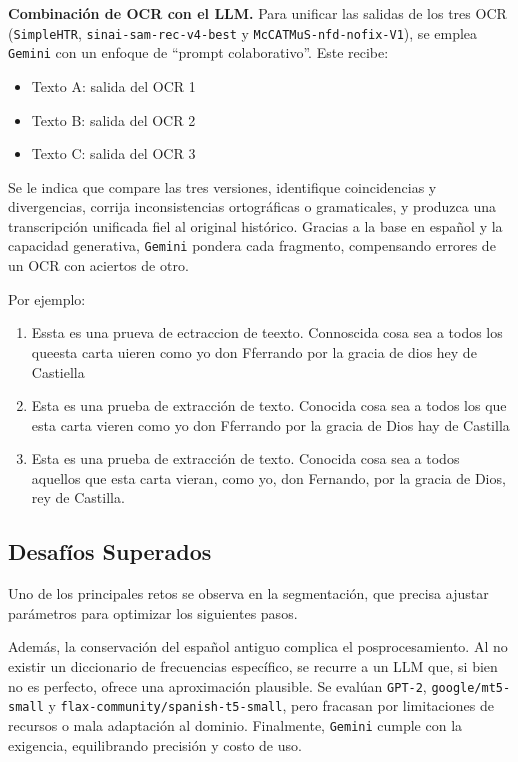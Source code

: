 \documentclass[11pt,a4paper]{article}
\begin{document}
\textbf{Combinación de OCR con el LLM.}  
Para unificar las salidas de los tres OCR (\texttt{SimpleHTR}, \texttt{sinai-sam-rec-v4-best} y \texttt{McCATMuS-nfd-nofix-V1}), se emplea \texttt{Gemini} con un enfoque de “prompt colaborativo”. Este recibe:

\begin{itemize}
\item Texto A: salida del OCR 1  
\item Texto B: salida del OCR 2  
\item Texto C: salida del OCR 3
\end{itemize}

Se le indica que compare las tres versiones, identifique coincidencias y divergencias, corrija inconsistencias ortográficas o gramaticales, y produzca una transcripción unificada fiel al original histórico. Gracias a la base en español y la capacidad generativa, \texttt{Gemini} pondera cada fragmento, compensando errores de un OCR con aciertos de otro.

Por ejemplo:

\begin{enumerate}
    \item Essta es una prueva de ectraccion de teexto. Connoscida cosa sea a todos los queesta carta uieren como yo don Fferrando por la gracia de dios hey de Castiella
    \item Esta es una prueba de extracción de texto. Conocida cosa sea a todos los que esta carta vieren como yo don Fferrando por la gracia de Dios hay de Castilla
    \item Esta es una prueba de extracción de texto. Conocida cosa sea a todos aquellos que esta carta vieran, como yo, don Fernando, por la gracia de Dios, rey de Castilla.
\end{enumerate}

\subsection{Desafíos Superados}

Uno de los principales retos se observa en la segmentación, que precisa ajustar parámetros para optimizar los siguientes pasos. 

Además, la conservación del español antiguo complica el posprocesamiento. Al no existir un diccionario de frecuencias específico, se recurre a un LLM que, si bien no es perfecto, ofrece una aproximación plausible. Se evalúan \texttt{GPT-2}, \texttt{google/mt5-small} y \texttt{flax-community/spanish-t5-small}, pero fracasan por limitaciones de recursos o mala adaptación al dominio. Finalmente, \texttt{Gemini} cumple con la exigencia, equilibrando precisión y costo de uso.
\end{document}
